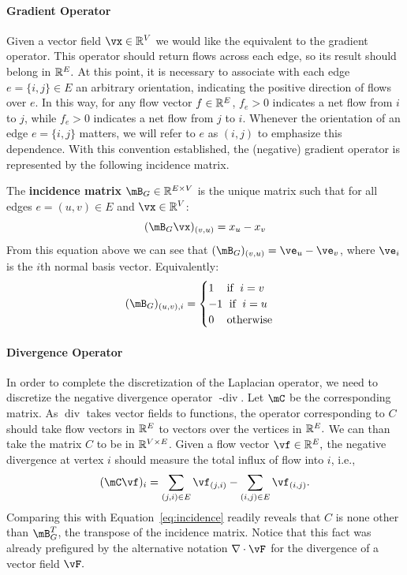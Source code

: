 \paragraph{Gradient Operator}
Given a vector field $\vx \in \R^V$ we would like the equivalent to the gradient operator.
%
This operator should return flows across each edge, so its result should belong in $\mathbb{R}^E.$
At this point, it is necessary to associate with each edge $e=\{i,j\} \in E$ an arbitrary orientation, indicating the positive direction of flows over $e$. In this way, for any flow vector $f \in \mathbb{R}^E$, $f_e > 0$ indicates a net flow from $i$ to $j$, while $f_e > 0$ indicates a net flow from $j$ to $i$.  Whenever the orientation of an edge $e = \{i,j\}$ matters, we will refer to $e$ as $(i,j)$ to emphasize this dependence. 
With this convention established, the (negative) gradient operator is represented  by the following incidence matrix.
%

\begin{definition}
The {\bf incidence matrix} $\mB_G \in \R^{E \times V}$ is the unique matrix such that for all edges $e=(u,v) \in E$ and $\vx \in \R^V$:
$$
(\mB_G \vx)_{(v, u)} = x_u - x_v
$$
From this equation above we can see that $(\mB_G)_{(v, u)} = \ve_u - \ve_v$, where $\ve_i$ is the $i$th normal basis vector. Equivalently:
\begin{equation}\label{eq:incidence}
(\mB_G)_{(u,v), i} = 
\begin{cases}
1 \; \;\;\textrm{ if }\; i=v \\
-1 \; \textrm{ if }\; i=u\\
0 \; \;\;\textrm{ otherwise}
\end{cases}
\end{equation}
\end{definition}

\paragraph{Divergence Operator}
In order to complete the discretization of the Laplacian operator, we need to discretize the negative divergence operator $\operatorname{-div}$. Let $\mC$ be the corresponding matrix.
As $\operatorname{div}$ takes vector fields to functions, the operator corresponding to $C$ should take flow vectors in $\mathbb{R}^E$ to vectors over the vertices in $\mathbb{R}^E.$ We can than take the matrix $C$ to be in $\mathbb{R}^{V \times E}$.
%
Given a flow vector $\vf \in \R^E,$ the negative divergence at vertex $i$ should measure the total influx of flow into $i$, i.e., 
$$
(\mC \vf)_{i} = \sum_{(j,i) \in E} \vf_{(j,i)} - \sum_{(i,j) \in E} \vf_{(i,j)}.
$$
Comparing this with Equation~\ref{eq:incidence} readily reveals that $C$ is none other than $\mB_G^T$, the transpose of the incidence matrix. Notice that this fact was already prefigured by the alternative notation $\nabla \cdot \vF$ for the divergence of a vector field $\vF.$


